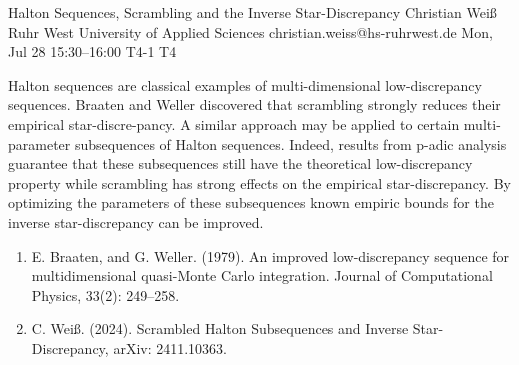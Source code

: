 \begin{talk}
  {Halton Sequences, Scrambling and the Inverse Star-Discrepancy}%
  {Christian Wei\ss{}}%
  {Ruhr West University of Applied Sciences}%
  {christian.weiss@hs-ruhrwest.de}%
  {}%
  {}%
  {Mon, Jul 28 15:30--16:00}%
  {T4-1}%
  {T4}%
  {}%
  
    
   
Halton sequences are classical examples of multi-dimensional low-discrepancy sequences. Braaten and Weller discovered that scrambling strongly reduces their empirical star-discre-pancy. A similar approach may be applied to certain multi-parameter subsequences of Halton sequences. Indeed, results from p-adic analysis guarantee that these subsequences still have the theoretical low-discrepancy property while scrambling has strong effects on the empirical star-discrepancy. By optimizing the parameters of these subsequences known empiric bounds for the inverse star-discrepancy can be improved.

\medskip


\begin{enumerate}
 \item[{[1]}] E. Braaten, and G. Weller. (1979). An improved low-discrepancy sequence for multidimensional quasi-Monte Carlo integration. Journal of Computational Physics, 33(2): 249--258.
 \item[{[2]}] C. Wei\ss{}. (2024). Scrambled Halton Subsequences and Inverse Star-Discrepancy, arXiv: 2411.10363. 
\end{enumerate}

\end{talk}

